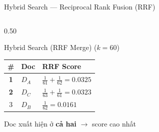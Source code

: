 \begin{frame}{Hybrid Search --- Reciprocal Rank Fusion (RRF)}
\begin{columns}[T]
\begin{column}{0.50\textwidth}
\vspace{0.1cm}

\begin{exampleblock}{\small\textcolor{accentTeal}{Hybrid Search (RRF Merge)} ($k=60$)}
{\scriptsize
\begin{tabular}{cll}
\textbf{\#} & \textbf{Doc} & \textbf{RRF Score} \\
\hline
\textbf{1} & $D_A$ & $\frac{1}{61} {+} \frac{1}{62} = \mathbf{0.0325}$ \\[2pt]
\textbf{2} & $D_C$ & $\frac{1}{63} {+} \frac{1}{61} = 0.0323$ \\[2pt]
3 & $D_B$ & $\frac{1}{62} = 0.0161$ \\
\end{tabular}
}
\end{exampleblock}

{\scriptsize\textcolor{accentTeal}{Doc xuất hiện ở \textbf{cả hai} $\to$ score cao nhất}}

\end{column}
\end{columns}
\end{frame}
